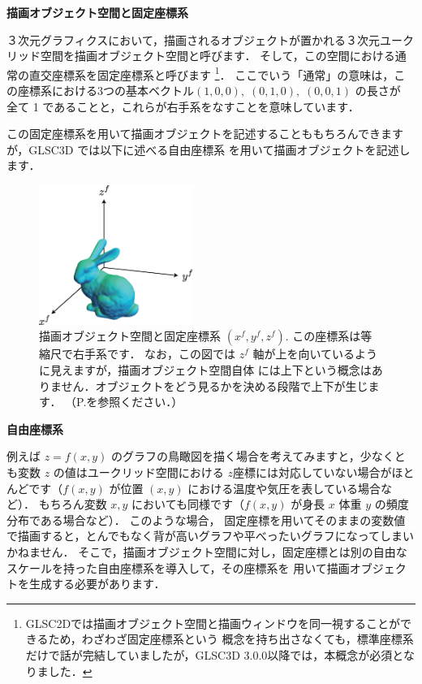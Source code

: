 \documentclass[platex,a4paper,12pt]{jsarticle}%
\begin{document}
\noindent
{\bf 描画オブジェクト空間と固定座標系}

３次元グラフィクスにおいて，描画されるオブジェクトが置かれる３次元ユークリッド空間を描画オブジェクト空間と呼びます．
そして，この空間における通常の直交座標系を固定座標系と呼びます
\footnote{GLSC2Dでは描画オブジェクト空間と描画ウィンドウを同一視することができるため，わざわざ固定座標系という
概念を持ち出さなくても，標準座標系だけで話が完結していましたが，GLSC3D 3.0.0以降では，本概念が必須となりました．}．
ここでいう「通常」の意味は，この座標系における3つの基本ベクトル$(1, 0, 0), \;(0, 1, 0),\; (0, 0, 1)$ の長さが
全て 1 であることと，これらが右手系をなすことを意味しています．

この固定座標系を用いて描画オブジェクトを記述することももちろんできますが，GLSC3D では以下に述べる自由座標系
を用いて描画オブジェクトを記述します．\\

\begin{figure}[htb]
\centering
\includegraphics[width=50mm]{ObjectSpace.eps}
\caption{\small{描画オブジェクト空間と固定座標系 $(x^{f}, y^{f}, z^{f})$. この座標系は等縮尺で右手系です．
なお，この図では $z^{f}$ 軸が上を向いているように見えますが，描画オブジェクト空間自体
には上下という概念はありません．オブジェクトをどう見るかを決める段階で上下が生じます．
（P.\pageref{g_vision}を参照ください．）}}
\end{figure}

\noindent
{\bf 自由座標系}

例えば $z = f(x, y)$ のグラフの鳥瞰図を描く場合を考えてみますと，少なくとも変数 $z$ の値はユークリッド空間における
$z$座標には対応していない場合がほとんどです（$f(x, y)$ が位置  $(x, y)$ における温度や気圧を表している場合など）．
もちろん変数 $x, y$  においても同様です（$f(x, y)$ が身長 $x$ 体重 $y$ の頻度分布である場合など）． このような場合，
固定座標を用いてそのままの変数値で描画すると，とんでもなく背が高いグラフや平べったいグラフになってしまいかねません．
そこで，描画オブジェクト空間に対し，固定座標とは別の自由なスケールを持った自由座標系を導入して，その座標系を
用いて描画オブジェクトを生成する必要があります．
\end{document}
